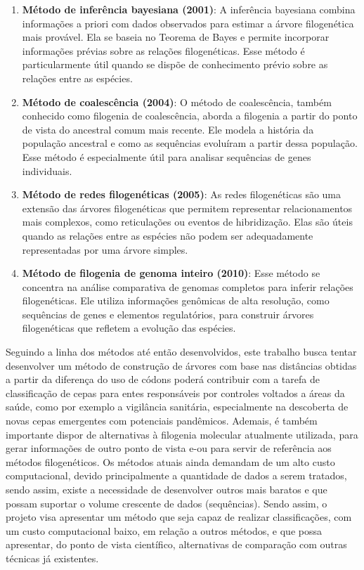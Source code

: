 \begin{enumerate}
  \item \textbf{Método de inferência bayesiana (2001)}: A inferência bayesiana combina informações a priori com dados observados para estimar a árvore filogenética mais provável. Ela se baseia no Teorema de Bayes e permite incorporar informações prévias sobre as relações filogenéticas. Esse método é particularmente útil quando se dispõe de conhecimento prévio sobre as relações entre as espécies.~\cite{huelsenbeck_bayesian_inference_2001}
  \item \textbf{Método de coalescência (2004)}: O método de coalescência, também conhecido como filogenia de coalescência, aborda a filogenia a partir do ponto de vista do ancestral comum mais recente. Ele modela a história da população ancestral e como as sequências evoluíram a partir dessa população. Esse método é especialmente útil para analisar sequências de genes individuais.~\cite{kingman_coalescent_1982}
  \item \textbf{Método de redes filogenéticas (2005)}: As redes filogenéticas são uma extensão das árvores filogenéticas que permitem representar relacionamentos mais complexos, como reticulações ou eventos de hibridização. Elas são úteis quando as relações entre as espécies não podem ser adequadamente representadas por uma árvore simples.~\cite{huson_phylogenetic_networks_2006}
  \item \textbf{Método de filogenia de genoma inteiro (2010)}: Esse método se concentra na análise comparativa de genomas completos para inferir relações filogenéticas. Ele utiliza informações genômicas de alta resolução, como sequências de genes e elementos regulatórios, para construir árvores filogenéticas que refletem a evolução das espécies.~\cite{eisen_horizontal_gene_transfre_2000}
\end{enumerate}

Seguindo a linha dos métodos até então desenvolvidos, este trabalho busca tentar desenvolver um método de construção de árvores com base nas distâncias obtidas a partir da diferença do uso de códons poderá contribuir com a tarefa de classificação de cepas para entes responsáveis por controles voltados a áreas da saúde, como por exemplo a vigilância sanitária, especialmente na descoberta de novas cepas emergentes com potenciais pandêmicos. Ademais, é também importante dispor de alternativas à filogenia molecular atualmente utilizada, para gerar informações de outro ponto de vista e-ou para servir de referência aos métodos filogenéticos.
Os métodos atuais ainda demandam de um alto custo computacional, devido principalmente a quantidade de dados a serem tratados, sendo assim, existe a necessidade de desenvolver outros mais baratos e que possam suportar o volume crescente de dados (sequências).
Sendo assim, o projeto visa apresentar um método que seja capaz de realizar classificações, com um custo computacional baixo, em relação a outros métodos, e que possa apresentar, do ponto de vista científico, alternativas de comparação com outras técnicas já existentes.

